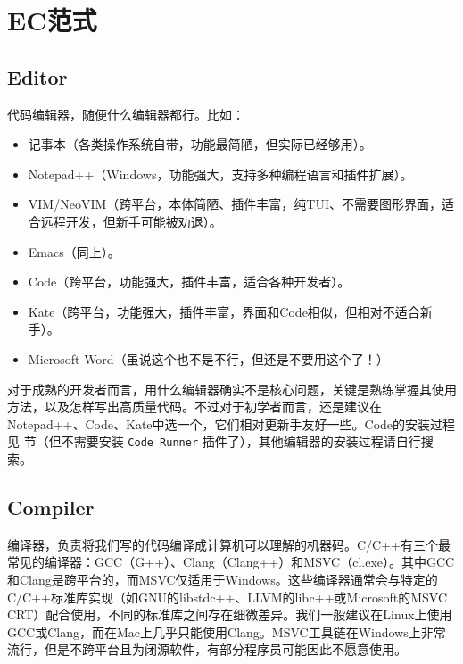 \section{EC范式}

\subsection{Editor} 代码编辑器，随便什么编辑器都行。比如：
\begin{itemize}
    \item 记事本（各类操作系统自带，功能最简陋，但实际已经够用）。
    \item Notepad++（Windows，功能强大，支持多种编程语言和插件扩展）。
    \item VIM/NeoVIM（跨平台，本体简陋、插件丰富，纯TUI、不需要图形界面，适合远程开发，但新手可能被劝退）。
    \item Emacs（同上）。
    \item Code（跨平台，功能强大，插件丰富，适合各种开发者）。
    \item Kate（跨平台，功能强大，插件丰富，界面和Code相似，但相对不适合新手）。
    \item Microsoft Word（虽说这个也不是不行，但还是不要用这个了！）
\end{itemize}
对于成熟的开发者而言，用什么编辑器确实不是核心问题，关键是熟练掌握其使用方法，以及怎样写出高质量代码。不过对于初学者而言，还是建议在Notepad++、Code、Kate中选一个，它们相对更新手友好一些。Code的安装过程见  节（但不需要安装 \verb|Code Runner| 插件了），其他编辑器的安装过程请自行搜索。

\subsection{Compiler} 编译器，负责将我们写的代码编译成计算机可以理解的机器码。C/C++有三个最常见的编译器：GCC（G++）、Clang（Clang++）和MSVC（cl.exe）。其中GCC和Clang是跨平台的，而MSVC仅适用于Windows。这些编译器通常会与特定的C/C++标准库实现（如GNU的libstdc++、LLVM的libc++或Microsoft的MSVC CRT）配合使用，不同的标准库之间存在细微差异。我们一般建议在Linux上使用GCC或Clang，而在Mac上几乎只能使用Clang。MSVC工具链在Windows上非常流行，但是不跨平台且为闭源软件，有部分程序员可能因此不愿意使用。

